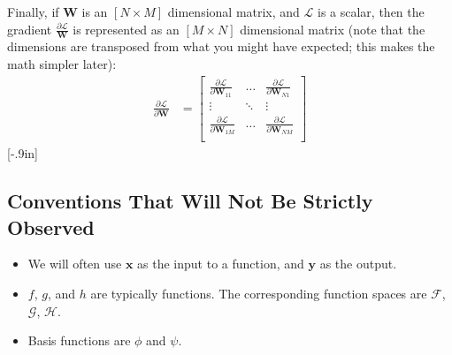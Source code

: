 Finally, if $\mathbf{W}$ is an $[N \times M]$ dimensional matrix, and $\mathcal{L}$ is a scalar, then the gradient $\frac{\partial \mathcal{L}}{\mathbf{W}}$ is represented as an $[M \times N]$ dimensional matrix (note that the dimensions are transposed from what you might have expected; this makes the math simpler later):
\begin{align}
    \frac{\partial \mathcal{L}}{\partial \mathbf{W}} &= 
        \begin{bmatrix}
            \frac{\partial \mathcal{L}}{\partial \mathbf{W}_{11}} & \ldots & \frac{\partial \mathcal{L}}{\partial \mathbf{W}_{N1}} \\
            \vdots & \ddots & \vdots \\
            \frac{\partial \mathcal{L}}{\partial \mathbf{W}_{1M}} & \ldots & \frac{\partial \mathcal{L}}{\partial \mathbf{W}_{NM}} \\
        \end{bmatrix} \label{backprop:scalar_matrix_deriv}
\end{align}
[-.9in]

\subsection*{Conventions That Will Not Be Strictly Observed}
\begin{itemize}
\item We will often use $\mathbf{x}$ as the input to a function, and $\mathbf{y}$ as the output.
\item $f$, $g$, and $h$ are typically functions. The corresponding function spaces are $\mathcal{F}$, $\mathcal{G}$, $\mathcal{H}$.
\item Basis functions are $\phi$ and $\psi$.
\end{itemize}


